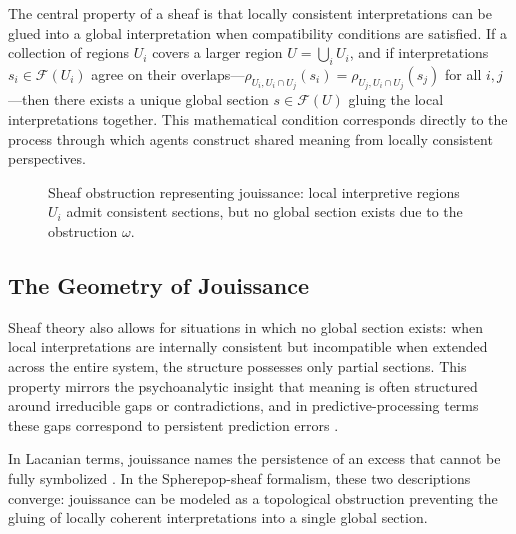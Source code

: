 \documentclass[12pt,a4paper]{article}
\begin{document}
The central property of a sheaf is that locally consistent interpretations can be glued into
a global interpretation when compatibility conditions are satisfied. If a collection of regions
$U_i$ covers a larger region $U = \bigcup_i U_i$, and if interpretations $s_i \in \mathcal{F}(U_i)$
agree on their overlaps---$\rho_{U_i, U_i \cap U_j}(s_i) = \rho_{U_j, U_i \cap U_j}(s_j)$
for all $i,j$---then there exists a unique global section $s \in \mathcal{F}(U)$ gluing the
local interpretations together. This mathematical condition corresponds directly to the process
through which agents construct shared meaning from locally consistent perspectives.

\begin{figure}[H]
\centering
{}
\caption{Sheaf obstruction representing jouissance: local interpretive regions $U_i$ admit
consistent sections, but no global section exists due to the obstruction $\omega$.}
\label{fig:sheaf-obstruction}
\end{figure}

\subsection*{The Geometry of Jouissance}

Sheaf theory also allows for situations in which no global section exists: when local
interpretations are internally consistent but incompatible when extended across the entire
system, the structure possesses only partial sections. This property mirrors the psychoanalytic
insight that meaning is often structured around irreducible gaps or contradictions, and in
predictive-processing terms these gaps correspond to persistent prediction errors
\citep{dallaglio2024}.

In Lacanian terms, jouissance names the persistence of an excess that cannot be fully
symbolized \citep{lacan2006}. In the Spherepop-sheaf formalism, these two descriptions
converge: jouissance can be modeled as a topological obstruction preventing the gluing of
locally coherent interpretations into a single global section.
\end{document}
